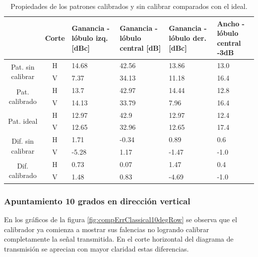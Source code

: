 \begin{table}[H]
  \footnotesize
  \centering
  \begin{tabular}{|c|c|p{2cm}|p{2.5cm}|p{2.5cm}|p{2.5cm}|}
    \cline{2-6}
    \multicolumn{1}{c|}{} & Corte & Ganancia - lóbulo izq. [dBc] & Ganancia - lóbulo central [dB] &
    Ganancia - lóbulo der. [dBc] & Ancho - lóbulo central -3dB \tabularnewline\hline
    \multirow{2}{2cm}{Pat. sin calibrar} & H & 14.68 & 42.56 & 13.86 & 13.0 \tabularnewline\cline{2-6}
     & V & 7.37 & 34.13 & 11.18 & 16.4 \tabularnewline\hline
    \multirow{2}{2cm}{Pat. calibrado} & H & 13.7 & 42.97 & 14.44 & 12.8 \tabularnewline\cline{2-6}
     & V & 14.13 & 33.79 & 7.96 & 16.4 \tabularnewline\hline
    \multirow{2}{2cm}{Pat. ideal} & H & 12.97 & 42.9 & 12.97 & 12.4 \tabularnewline\cline{2-6}
     & V & 12.65 & 32.96 & 12.65 & 17.4 \tabularnewline\hline
    \multirow{2}{2cm}{Dif. sin calibrar} & H & 1.71 & -0.34 & 0.89 & 0.6\tabularnewline\cline{2-6}
     & V & -5.28 & 1.17 & -1.47 & -1.0 \tabularnewline\hline
    \multirow{2}{2cm}{Dif. calibrado} & H & 0.73 & 0.07 & 1.47 & 0.4 \tabularnewline\cline{2-6}
     & V & 1.48 & 0.83 & -4.69 & -1.0 \tabularnewline\hline
  \end{tabular}
  \caption{Propiedades de los patrones calibrados y sin calibrar comparados con el ideal.}
  \label{tab:compErrClassical10degCol}
\end{table}


\subsubsection{Apuntamiento 10 grados en dirección vertical}

En los gráficos de la figura \ref{fig:compErrClassical10degRow} se observa que el calibrador ya comienza a mostrar sus falencias no 
logrando calibrar completamente la señal transmitida. En el corte horizontal del diagrama de transmisión se aprecian con mayor 
claridad estas diferencias.

